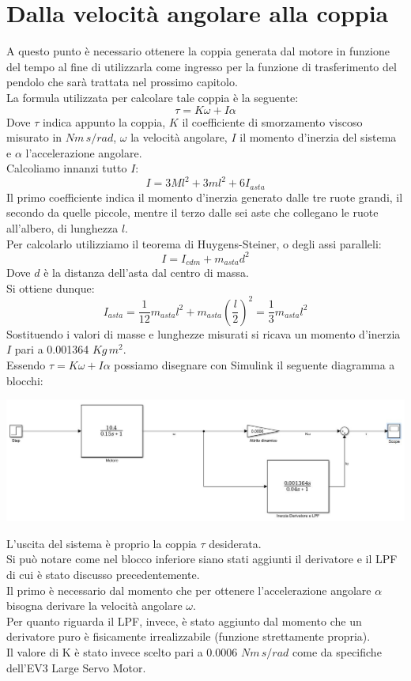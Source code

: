 \section{Dalla velocità angolare alla coppia}
A questo punto è necessario ottenere la coppia generata dal motore in funzione del tempo al fine di utilizzarla come ingresso per la funzione di trasferimento del pendolo che sarà trattata nel prossimo capitolo.\\
La formula utilizzata per calcolare tale coppia è la seguente:
$$
\tau=K\omega+I\alpha
$$
Dove $\tau$ indica appunto la coppia, $K$ il coefficiente di smorzamento viscoso misurato in $Nm\,s/rad$, $\omega$ la velocità angolare, $I$ il momento d'inerzia del sistema e $\alpha$ l'accelerazione angolare.\\
Calcoliamo innanzi tutto $I$: 
$$
I=3Ml^2+3ml^2+6I_{asta}
$$
Il primo coefficiente indica il momento d'inerzia generato dalle tre ruote grandi, il secondo da quelle piccole, mentre il terzo dalle sei aste che collegano le ruote all'albero, di lunghezza $l$.\\
Per calcolarlo utilizziamo il teorema di Huygens-Steiner, o degli assi paralleli:
$$
I=I_{cdm}+m_{asta}d^2
$$
Dove $d$ è la distanza dell'asta dal centro di massa.\\
Si ottiene dunque:
$$
I_{asta}=\displaystyle\frac{1}{12}m_{asta}l^2+m_{asta}(\displaystyle\frac{l}{2})^2=\displaystyle\frac{1}{3}m_{asta}l^2
$$
Sostituendo i valori di masse e lunghezze misurati si ricava un momento d'inerzia $I$ pari a 0.001364 $Kg\,m^2$.\\
Essendo $\tau=K\omega+I\alpha$ possiamo disegnare con Simulink il seguente diagramma a blocchi:
\begin{center}
	\includegraphics[width=\textwidth]{modMotoreTorque.jpg}
\end{center}
L'uscita del sistema è proprio la coppia $\tau$ desiderata.\\
Si può notare come nel blocco inferiore siano stati aggiunti il derivatore e il LPF di cui è stato discusso precedentemente.\\
Il primo è necessario dal momento che per ottenere l'accelerazione angolare $\alpha$ bisogna derivare la velocità angolare $\omega$.\\
Per quanto riguarda il LPF, invece, è stato aggiunto dal momento che un derivatore puro è fisicamente irrealizzabile (funzione strettamente propria).\\
Il valore di K è stato invece scelto pari a 0.0006 $Nm\,s/rad$ come da specifiche dell'EV3 Large Servo Motor.\\